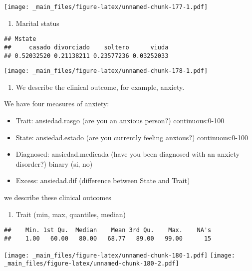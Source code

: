 \documentclass[
]{book}
\providecommand{\tightlist}{%
  \setlength{\itemsep}{0pt}\setlength{\parskip}{0pt}}
\begin{document}
\texttt{[image: \_main\_files/figure-latex/unnamed-chunk-177-1.pdf]}

\begin{enumerate}
\def\labelenumi{\alph{enumi}.}
\setcounter{enumi}{3}
\tightlist
\item
  Marital status
\end{enumerate}

\begin{verbatim}
## Mstate
##     casado divorciado    soltero      viuda 
## 0.52032520 0.21138211 0.23577236 0.03252033
\end{verbatim}

\texttt{[image: \_main\_files/figure-latex/unnamed-chunk-178-1.pdf]}

\begin{enumerate}
\def\labelenumi{\arabic{enumi}.}
\setcounter{enumi}{1}
\tightlist
\item
  We describe the clinical outcome, for example, anxiety.
\end{enumerate}

We have four measures of anxiety:

\begin{itemize}
\tightlist
\item
  Trait: ansiedad.rasgo (are you an anxious person?) continuous:0-100
\item
  State: ansiedad.estado (are you currently feeling anxious?) continuous:0-100
\item
  Diagnosed: ansiedad.medicada (have you been diagnosed with an anxiety disorder?) binary (si, no)
\item
  Excess: ansiedad.dif (difference between State and Trait)
\end{itemize}

we describe these clinical outcomes

\begin{enumerate}
\def\labelenumi{\alph{enumi}.}
\tightlist
\item
  Trait (min, max, quantiles, median)
\end{enumerate}

\begin{verbatim}
##    Min. 1st Qu.  Median    Mean 3rd Qu.    Max.    NA's 
##    1.00   60.00   80.00   68.77   89.00   99.00      15
\end{verbatim}

\texttt{[image: \_main\_files/figure-latex/unnamed-chunk-180-1.pdf]} \texttt{[image: \_main\_files/figure-latex/unnamed-chunk-180-2.pdf]}
\end{document}
